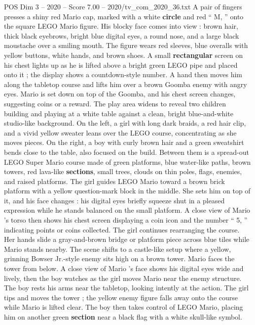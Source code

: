 \begin{textsample}{POS Dim 3 – 2020 – Score 7.00 – 2020/tv\_com\_2020\_36.txt}  \label{ex:f3_pos_073}
A pair of fingers presses a shiny red Mario cap, marked with a white \textbf{circle} and red “ M, ” onto the square LEGO Mario figure.
His blocky face comes into view : brown hair, thick black eyebrows, bright blue digital eyes, a round nose, and a large black moustache over a smiling mouth.
The figure wears red sleeves, blue overalls with yellow buttons, white hands, and brown shoes.
A small \textbf{rectangular} screen on his chest lights up as he is lifted above a bright green LEGO pipe and placed onto it ; the display shows a countdown-style number.
A hand then moves him along the tabletop course and lifts him over a brown Goomba enemy with angry eyes.
Mario is set down on top of the Goomba, and his chest screen changes, suggesting coins or a reward.
The play area widens to reveal two children building and playing at a white table against a clean, bright blue-and-white studio-like background.
On the left, a girl with long dark braids, a red hair clip, and a vivid yellow sweater leans over the LEGO course, concentrating as she moves pieces.
On the right, a boy with curly brown hair and a green sweatshirt bends close to the table, also focused on the build.
Between them is a spread-out LEGO Super Mario course made of green platforms, blue water-like paths, brown towers, red lava-like \textbf{sections}, small trees, clouds on thin poles, flags, enemies, and raised platforms.
The girl guides LEGO Mario toward a brown brick platform with a yellow question-mark block in the middle.
She sets him on top of it, and his face changes : his digital eyes briefly squeeze shut in a pleased expression while he stands balanced on the small platform.
A close view of Mario ’s torso then shows his chest screen displaying a coin icon and the number “ 5, ” indicating points or coins collected.
The girl continues rearranging the course.
Her hands slide a gray-and-brown bridge or platform piece across blue tiles while Mario stands nearby.
The scene shifts to a castle-like setup where a yellow, grinning Bowser Jr.-style enemy sits high on a brown tower.
Mario faces the tower from below.
A close view of Mario ’s face shows his digital eyes wide and lively, then the boy watches as the girl moves Mario near the enemy structure.
The boy rests his arms near the tabletop, looking intently at the action.
The girl tips and moves the tower ; the yellow enemy figure falls away onto the course while Mario is lifted clear.
The boy then takes control of LEGO Mario, placing him on another green \textbf{section} near a black flag with a white skull-like symbol.

\end{textsample}
